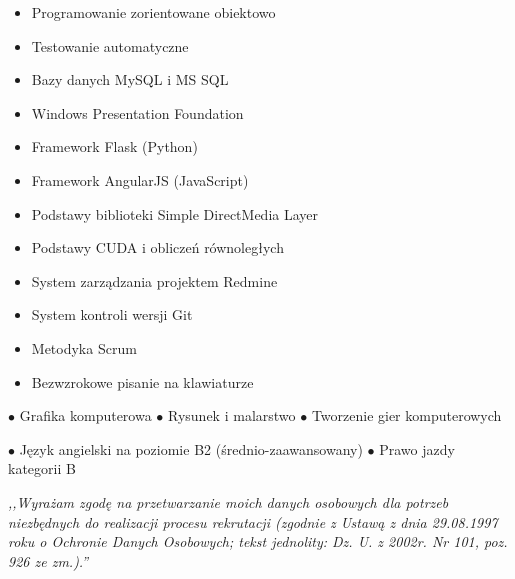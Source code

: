 \documentclass[11pt,a4paper]{article}
\begin{document}

    \vspace{0.1cm}

    \medskip
    \begin{itemize} \itemsep2pt \parskip0pt 
        \item Programowanie zorientowane obiektowo
        \item Testowanie automatyczne
        \item Bazy danych MySQL i MS SQL
        \item Windows Presentation Foundation
        \item Framework Flask (Python)
        \item Framework AngularJS (JavaScript)
        \item Podstawy biblioteki Simple DirectMedia Layer
        \item Podstawy CUDA i obliczeń równoległych
        \item System zarządzania projektem Redmine
        \item System kontroli wersji Git
        \item Metodyka Scrum
        \item Bezwzrokowe pisanie na klawiaturze
    \end{itemize}
  
  
    \vspace{0.3cm}
  
    \medskip
    $\bullet$ Grafika komputerowa
    \hfill
    $\bullet$ Rysunek i malarstwo
    \hfill
    $\bullet$ Tworzenie gier komputerowych
  
  
    \vspace{0.5cm}
  
    \medskip
    $\bullet$ Język angielski na poziomie B2 (średnio-zaawansowany)
    \hfill
    $\bullet$ Prawo jazdy kategorii B
  
  
    \vspace{8cm}
    \noindent \textit{,,Wyrażam zgodę na przetwarzanie moich danych osobowych dla potrzeb
    niezbędnych do realizacji procesu rekrutacji (zgodnie z Ustawą z dnia 29.08.1997 roku o Ochronie
    Danych Osobowych; tekst jednolity: Dz. U. z 2002r. Nr 101, poz. 926 ze zm.).''}
\end{document}
